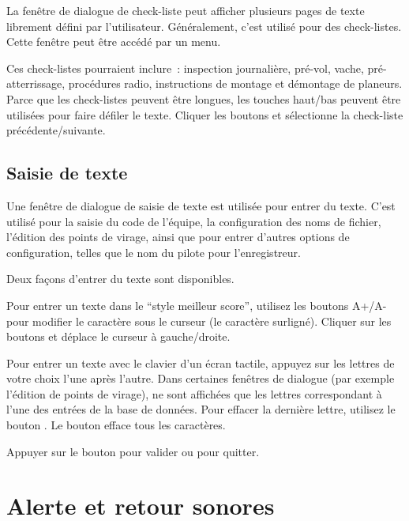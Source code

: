 La fenêtre de dialogue de check-liste peut afficher plusieurs pages de texte librement défini par l'utilisateur.
Généralement, c'est utilisé pour des check-listes. Cette fenêtre peut être accédé par un menu.

\blink{}

Ces check-listes pourraient inclure~: inspection journalière, pré-vol, 
vache, pré-atterrissage, procédures radio, instructions de montage et
démontage de planeurs. Parce que les check-listes peuvent être longues, les
touches haut/bas peuvent être utilisées pour faire défiler le texte. Cliquer les
boutons \bmenuw{$<$} et \bmenuw{$>$} sélectionne la check-liste précédente/suivante.


\subsection*{Saisie de texte} \label{sec:textentry}

Une fenêtre de dialogue de saisie de texte est utilisée pour entrer du texte. C'est utilisé pour la
saisie du code de l'équipe, la configuration des noms de fichier, l'édition des points de virage, ainsi que pour entrer
d'autres options de configuration, telles que le nom du pilote pour l'enregistreur.

Deux façons d'entrer du texte sont disponibles.

Pour entrer un texte dans le ``style meilleur score'', utilisez les boutons A+/A- pour modifier le
caractère sous le curseur (le caractère surligné). Cliquer sur les boutons \button{$<$} 
et \button{$>$} déplace le curseur à gauche/droite.

Pour entrer un texte avec le clavier d'un écran tactile, appuyez sur les lettres de votre choix
l'une après l'autre. Dans certaines fenêtres de dialogue (par exemple l'édition de points de virage), ne sont affichées
que les lettres correspondant à l'une des entrées de la base de données. Pour effacer la 
dernière lettre, utilisez le bouton \button{$<-$}. Le bouton  efface tous les caractères.

Appuyer sur le bouton  pour valider ou   pour quitter.


\section{Alerte et retour sonores}

